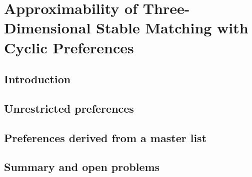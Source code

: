 \chapter{Approximability of Three-Dimensional Stable Matching with Cyclic Preferences}
\label{c:three_dsm_cyc}

\section{Introduction}
\label{sec:three_dsm_cyc_intro}


\section{Unrestricted preferences}
\label{sec:three_dsm_cyc_unrestricted_preferences}


\section{Preferences derived from a master list}
\label{sec:three_dsm_cyc_masterlist}


\section{Summary and open problems}
\label{sec:three_dsm_cyc_conclusion}
